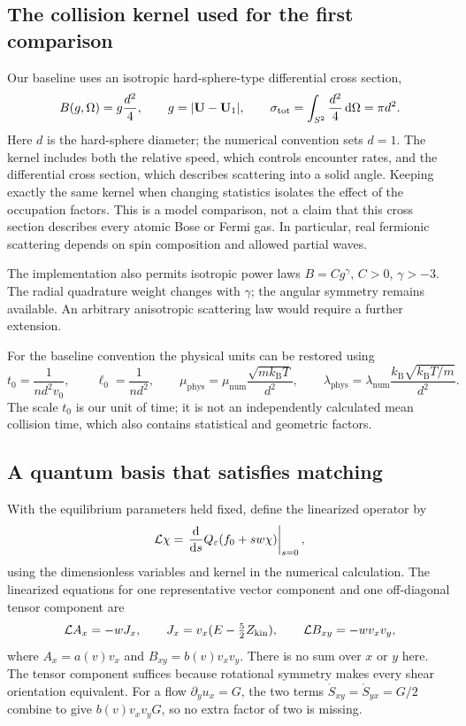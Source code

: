 \subsection{The collision kernel used for the first comparison}
Our baseline uses an isotropic hard-sphere-type differential cross section,
\begin{equation}
 B(g,\Omega)=g\frac{d^2}{4},\qquad
 g=|\mathbf U-\mathbf U_1|,\qquad
 \sigma_{\mathrm{tot}}=\int_{S^2}\frac{d^2}{4}\,\mathrm d\Omega=\pi d^2.
 \label{qt:kernel}
\end{equation}
Here $d$ is the hard-sphere diameter; the numerical convention sets $d=1$.
The kernel includes both the relative speed, which controls encounter rates,
and the differential cross section, which describes scattering into a solid
angle. Keeping exactly the same kernel when changing statistics isolates the
effect of the occupation factors. This is a model comparison, not a claim
that this cross section describes every atomic Bose or Fermi gas. In particular,
real fermionic scattering depends on spin composition and allowed partial waves.

The implementation also permits isotropic power laws $B=Cg^\gamma$,
$C>0$, $\gamma>-3$. The radial quadrature weight changes with $\gamma$;
the angular symmetry remains available. An arbitrary anisotropic scattering
law would require a further extension.

For the baseline convention the physical units can be restored using
\begin{equation}
 t_0=\frac1{nd^2v_0},\qquad \ell_0=\frac1{nd^2},\qquad
 \mu_{\mathrm{phys}}=\mu_{\mathrm{num}}\frac{\sqrt{mk_{\mathrm B}T}}{d^2},
 \qquad
 \lambda_{\mathrm{phys}}=\lambda_{\mathrm{num}}
 \frac{k_{\mathrm B}\sqrt{k_{\mathrm B}T/m}}{d^2}.
 \label{qt:restore}
\end{equation}
The scale $t_0$ is our unit of time; it is not an independently calculated
mean collision time, which also contains statistical and geometric factors.

\subsection{A quantum basis that satisfies matching}
With the equilibrium parameters held fixed, define the linearized operator by
\begin{equation}
 \mathcal L\chi=\left.\frac{\mathrm d}{\mathrm ds}
 Q_\varepsilon(f_0+s w\chi)\right|_{s=0},
\end{equation}
using the dimensionless variables and kernel in the numerical calculation.
The linearized equations for one representative vector component and one
off-diagonal tensor component are
\begin{equation}
 \mathcal L A_x=-wJ_x,\qquad J_x=v_x(E-\tfrac52Z_{\mathrm{kin}}),\qquad
 \mathcal L B_{xy}=-wv_xv_y,
 \label{qt:profileeq}
\end{equation}
where $A_x=a(v)v_x$ and $B_{xy}=b(v)v_xv_y$.
There is no sum over $x$ or $y$ here. The tensor component suffices because
rotational symmetry makes every shear orientation equivalent. For a flow
$\partial_yu_x=G$, the two terms $\mathring S_{xy}=\mathring S_{yx}=G/2$
combine to give $b(v)v_xv_yG$, so no extra factor of two is missing.


